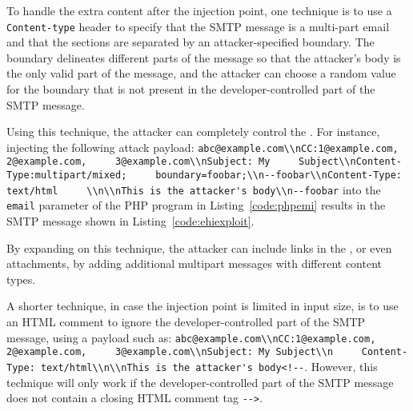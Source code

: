 To handle the extra content after the injection point, one technique
is to use a \texttt{Content-type} header to specify that the SMTP
message is a multi-part email and that the sections are separated by
an attacker-specified boundary. The boundary delineates different
parts of the message so that the attacker's body is the only valid
part of the message, and the attacker can choose a random value for
the boundary that is not present in the developer-controlled part of
the SMTP message.

Using this technique, the attacker can completely control the \email.
For instance, injecting the following attack payload:
\texttt{\lstinline{abc@example.com\\nCC:1@example.com, 2@example.com,
    3@example.com\\nSubject: My
    Subject\\nContent-Type:multipart/mixed;
    boundary=foobar;\\n--foobar\\nContent-Type: text/html
    \\n\\nThis is the attacker's body\\n--foobar}} into the \texttt{email} parameter
of the PHP program in Listing~\ref{code:phpemi} results in
the SMTP message shown in Listing~\ref{code:ehiexploit}.

By expanding on this technique, the attacker can include links in the
\email, or even attachments, by adding additional multipart messages
with different content types.

A shorter technique, in case the injection point is limited in input
size, is to use an HTML comment to ignore the developer-controlled
part of the SMTP message, using a payload such as:
\texttt{\lstinline{abc@example.com\\nCC:1@example.com, 2@example.com,
    3@example.com\\nSubject: My Subject\\n
    Content-Type: text/html\\n\\nThis is the attacker's body<!--}}. However, this
technique will only work if the developer-controlled part of the SMTP
message does not contain a closing HTML comment tag
\texttt{\lstinline{-->}}.

